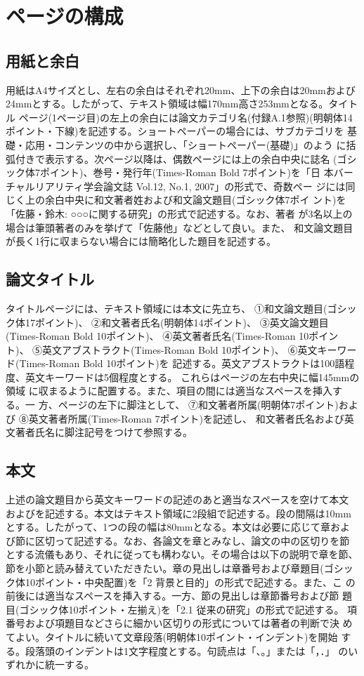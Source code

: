 \documentclass[a4paper,twoside]{jarticle}
\begin{document}
\section{ページの構成}

\subsection{用紙と余白}
用紙はA4サイズとし、左右の余白はそれぞれ20mm、上下の余白は20mmおよび
24mmとする。したがって、テキスト領域は幅170mm高さ253mmとなる。タイトル
ページ(1ページ目)の左上の余白には論文カテゴリ名(付録A.1参照)(明朝体14
ポイント・下線)を記述する。ショートペーパーの場合には、サブカテゴリを
基礎・応用・コンテンツの中から選択し、「ショートペーパー(基礎)」のよう
に括弧付きで表示する。次ページ以降は、偶数ページには上の余白中央に誌名
(ゴシック体7ポイント)、巻号・発行年(Times-Roman Bold 7ポイント)を「日
本バーチャルリアリティ学会論文誌 Vol.12, No.1, 2007」の形式で、奇数ペー
ジには同じく上の余白中央に和文著者姓および和文論文題目(ゴシック体7ポイ
ント)を「佐藤・鈴木: ○○○に関する研究」の形式で記述する。なお、著者
が3名以上の場合は筆頭著者のみを挙げて「佐藤他」などとして良い。また、
和文論文題目が長く1行に収まらない場合には簡略化した題目を記述する。

\subsection{論文タイトル}
タイトルページには、テキスト領域には本文に先立ち、
①和文論文題目(ゴシック体17ポイント)、
②和文著者氏名(明朝体14ポイント)、
③英文論文題目(Times-Roman Bold 10ポイント)、
④英文著者氏名(Times-Roman 10ポイント)、
⑤英文アブストラクト(Times-Roman Bold 10ポイント)、
⑥英文キーワード(Times-Roman Bold 10ポイント)を
記述する。英文アブストラクトは100語程度、英文キーワードは5個程度とする。
これらはページの左右中央に幅145mmの領域
に収まるように配置する。また、項目の間には適当なスペースを挿入する。一
方、ページの左下に脚注として、
⑦和文著者所属(明朝体7ポイント)および
⑧英文著者所属(Times-Roman 7ポイント)を記述し、
和文著者氏名および英文著者氏名に脚注記号をつけて参照する。

\subsection{本文}
上述の論文題目から英文キーワードの記述のあと適当なスペースを空けて本文
およびを記述する。本文はテキスト領域に2段組で記述する。段の間隔は10mm
とする。したがって、1つの段の幅は80mmとなる。本文は必要に応じて章およ
び節に区切って記述する。なお、各論文を章とみなし、論文の中の区切りを節
とする流儀もあり、それに従っても構わない。その場合は以下の説明で章を節、
節を小節と読み替えていただきたい。章の見出しは章番号および章題目(ゴシッ
ク体10ポイント・中央配置)を「2 背景と目的」の形式で記述する。また、こ
の前後には適当なスペースを挿入する。一方、節の見出しは章節番号および節
題目(ゴシック体10ポイント・左揃え)を「2.1 従来の研究」の形式で記述する。
項番号および項題目などさらに細かい区切りの形式については著者の判断で決
めてよい。タイトルに続いて文章段落(明朝体10ポイント・インデント)を開始
する。段落頭のインデントは1文字程度とする。句読点は「、。」または「，．」
のいずれかに統一する。
\end{document}
